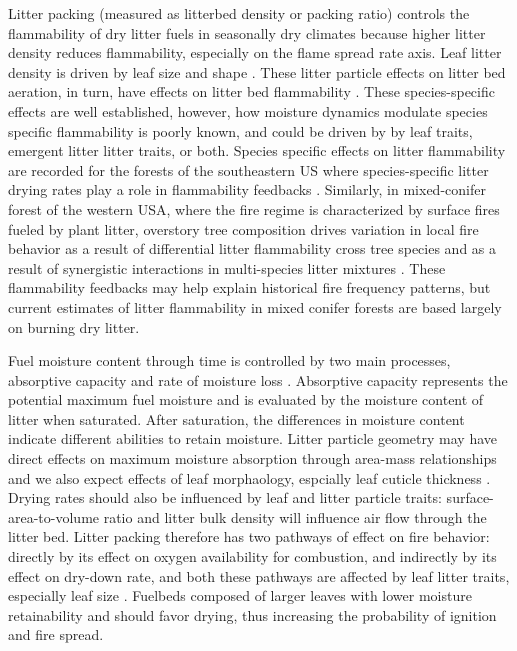 \documentclass[fire,article,submit,moreauthors,pdftex]{Definitions/mdpi}
\begin{document}

Litter packing (measured as litterbed density or packing ratio) controls the
flammability of dry litter fuels in seasonally dry climates because higher
litter density reduces flammability, especially on the flame spread rate axis.
Leaf litter density is driven by leaf size and shape
\cite{Fonda+Belanger+etal-1998, Scarff+Westoby-2006, Kane+Varner+etal-2008}.
These litter particle effects on litter bed aeration, in turn, have effects on
litter bed flammability \cite{Ganteaume+Marielle+etal-2011,
  Schwilk+Caprio-2011, Kreye+Varner+etal-2013}. These species-specific effects
are well established, however, how moisture dynamics modulate species specific
flammability is poorly known, and could be driven by by leaf traits, emergent
litter litter traits, or both. Species specific effects on litter flammability
are recorded for the forests of the southeastern US \cite{Nowacki+Abrams-2008}
where species-specific litter drying rates play a role in flammability
feedbacks \cite{Kreye+Varner+etal-2013}. Similarly, in mixed-conifer forest of
the western USA, where the fire regime is characterized by surface fires fueled
by plant litter, overstory tree composition drives variation in local fire
behavior \cite{Schwilk+Caprio-2011} as a result of differential litter
flammability cross tree species and as a result of synergistic interactions in
multi-species litter mixtures \cite{Magalhaes+Schwilk-2012}. These flammability
feedbacks may help explain historical fire frequency patterns, but current
estimates of litter flammability in mixed conifer forests are based largely on
burning dry litter.

Fuel moisture content through time is controlled by two main processes, absorptive capacity and rate of moisture loss \citep{Kreye+Kobziar+etal-2013}. Absorptive capacity represents the potential maximum fuel moisture and is evaluated by the moisture content of litter when saturated. After saturation, the differences in moisture content indicate different abilities to retain moisture. Litter particle geometry may have direct effects on maximum moisture absorption through area-mass relationships and we also expect effects of leaf morphaology, espcially leaf cuticle thickness \cite{Van_Wagner-1969}. Drying rates should also be influenced by leaf and litter particle traits: surface-area-to-volume ratio and litter bulk density will influence air flow through the litter bed. Litter packing therefore has two pathways of effect on fire behavior: directly by its effect on oxygen availability for combustion, and indirectly by its effect on dry-down rate, and both these pathways are affected by leaf litter traits, especially leaf size \cite{Scarff+Westoby-2006}. Fuelbeds composed of larger leaves with lower moisture retainability and should favor drying, thus increasing the probability of ignition and fire spread.
\end{document}
